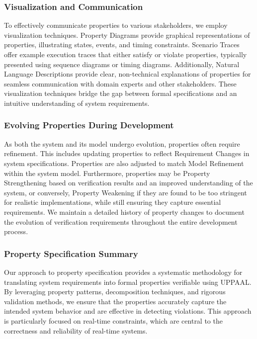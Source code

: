 \subsubsection{Visualization and Communication}
To effectively communicate properties to various stakeholders, we employ visualization techniques. Property Diagrams provide graphical representations of properties, illustrating states, events, and timing constraints. Scenario Traces offer example execution traces that either satisfy or violate properties, typically presented using sequence diagrams or timing diagrams. Additionally, Natural Language Descriptions provide clear, non-technical explanations of properties for seamless communication with domain experts and other stakeholders. These visualization techniques bridge the gap between formal specifications and an intuitive understanding of system requirements.

\subsubsection{Evolving Properties During Development}
As both the system and its model undergo evolution, properties often require refinement. This includes updating properties to reflect Requirement Changes in system specifications. Properties are also adjusted to match Model Refinement within the system model. Furthermore, properties may be Property Strengthening based on verification results and an improved understanding of the system, or conversely, Property Weakening if they are found to be too stringent for realistic implementations, while still ensuring they capture essential requirements. We maintain a detailed history of property changes to document the evolution of verification requirements throughout the entire development process.

\subsubsection{Property Specification Summary}
Our approach to property specification provides a systematic methodology for translating system requirements into formal properties verifiable using UPPAAL. By leveraging property patterns, decomposition techniques, and rigorous validation methods, we ensure that the properties accurately capture the intended system behavior and are effective in detecting violations. This approach is particularly focused on real-time constraints, which are central to the correctness and reliability of real-time systems.

